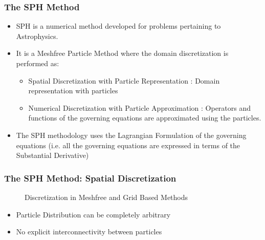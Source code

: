 \documentclass{beamer}
\begin{document}
 \begin{frame} %
  \frametitle{The SPH Method}
  \begin{itemize}
   \item SPH is a numerical method developed for problems pertaining to Astrophysics. \pause
   \item It is a Meshfree Particle Method where the domain discretization is performed as:
   \begin{itemize}
    \item Spatial Discretization with Particle Representation : Domain representation with particles
    \item Numerical Discretization with Particle Approximation : Operators and functions of the governing equations are approximated using the particles.
   \end{itemize} \pause
   \item The SPH methodology uses the Lagrangian Formulation of the governing equations (i.e. all the governing equations are expressed in terms of the Substantial Derivative)
  \end{itemize}
 \end{frame}
 
  \begin{frame} %
  \frametitle{The SPH Method: Spatial Discretization}
  \begin{figure}
   \caption{Discretization in Meshfree and Grid Based Methods}
  \end{figure}
  \begin{itemize}\pause
   \item Particle Distribution can be completely arbitrary
   \item No explicit interconnectivity between particles
  \end{itemize}
 \end{frame}
 
\end{document}
